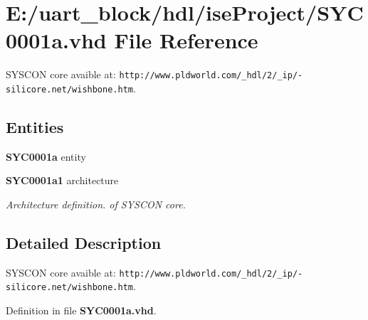 \section{E\-:/uart\-\_\-block/hdl/ise\-Project/\-S\-Y\-C0001a.vhd File Reference}
\label{_s_y_c0001a_8vhd}


S\-Y\-S\-C\-O\-N core avaible at\-: {\tt http\-://www.\-pldworld.\-com/\-\_\-hdl/2/\-\_\-ip/-\/silicore.\-net/wishbone.\-htm}.  


\subsection*{Entities}
\begin{DoxyCompactItemize}
\item 
{\bf S\-Y\-C0001a} entity
\item 
{\bf S\-Y\-C0001a1} architecture
\begin{DoxyCompactList}\small\item\em Architecture definition. of S\-Y\-S\-C\-O\-N core. \end{DoxyCompactList}\end{DoxyCompactItemize}


\subsection{Detailed Description}
S\-Y\-S\-C\-O\-N core avaible at\-: {\tt http\-://www.\-pldworld.\-com/\-\_\-hdl/2/\-\_\-ip/-\/silicore.\-net/wishbone.\-htm}. 

Definition in file {\bf S\-Y\-C0001a.\-vhd}.

